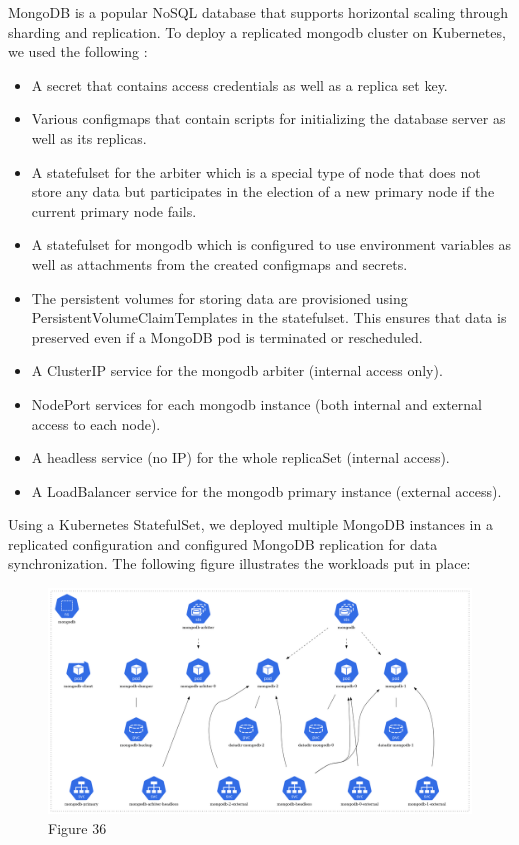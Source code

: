 MongoDB is a popular NoSQL database that supports horizontal scaling through sharding and replication. To deploy a replicated mongodb cluster on Kubernetes, we used the following : 
\begin{itemize}[label={--}]
\item A secret that contains access credentials as well as a replica set key. 
\item Various configmaps that contain scripts for initializing the database server as well as its replicas. 
\item A statefulset for the arbiter which is a special type of node that does not store any data but participates in the election of a new primary node if the current primary node fails. 
\item A statefulset for mongodb which is configured to use environment variables as well as attachments from the created configmaps and secrets. 
\item The persistent volumes for storing data are provisioned using PersistentVolumeClaimTemplates in the statefulset. This ensures that data is preserved even if a MongoDB pod is terminated or rescheduled. 
\item A ClusterIP service for the mongodb arbiter (internal access only). 
\item NodePort services for each mongodb instance (both internal and external access to each node). 
\item A headless service (no IP) for the whole replicaSet (internal access). 
\item A LoadBalancer service for the mongodb primary instance (external access). 
\end{itemize}

Using a Kubernetes StatefulSet, we deployed multiple MongoDB instances in a replicated configuration and configured MongoDB replication for data synchronization. The following figure illustrates the workloads put in place: 


\begin{figure}[H]\centering
\includegraphics[width=1.0\textwidth,angle=00]{assets/f36.png}
\caption{Figure 36 }
\label{fig:f36}
\end{figure}

